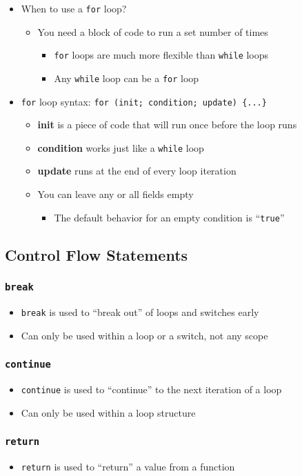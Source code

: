 \documentclass{article}
\begin{document}
\begin{itemize}
	\item When to use a \texttt{for} loop?
	\begin{itemize}
		\item You need a block of code to run a set number of times
		\begin{itemize}
			\item \texttt{for} loops are much more flexible than \texttt{while} loops
			\item Any \texttt{while} loop can be a \texttt{for} loop
		\end{itemize} 
	\end{itemize}
	\item \texttt{for} loop syntax: \texttt{for (init; condition; update) \{...\}} 
	\begin{itemize}
		\item \textbf{init} is a piece of code that will run once before the loop runs
		\item \textbf{condition} works just like a \texttt{while} loop
		\item \textbf{update} runs at the end of every loop iteration
		\item You can leave any or all fields empty \begin{itemize}
			\item The default behavior for an empty condition is ``\texttt{true}''
		\end{itemize}
	\end{itemize}
\end{itemize}

\subsection{Control Flow Statements}

\subsubsection{\texttt{break}}

\begin{itemize}
	\item \texttt{break} is used to ``break out'' of loops and switches early
	\item Can only be used within a loop or a switch, not any scope
\end{itemize}

\subsubsection{\texttt{continue}}

\begin{itemize}
	\item \texttt{continue} is used to ``continue'' to the next iteration of a loop
	\item Can only be used within a loop structure
\end{itemize}

\subsubsection{\texttt{return}}

\begin{itemize}
	\item \texttt{return} is used to ``return'' a value from a function
\end{itemize}
\end{document}
